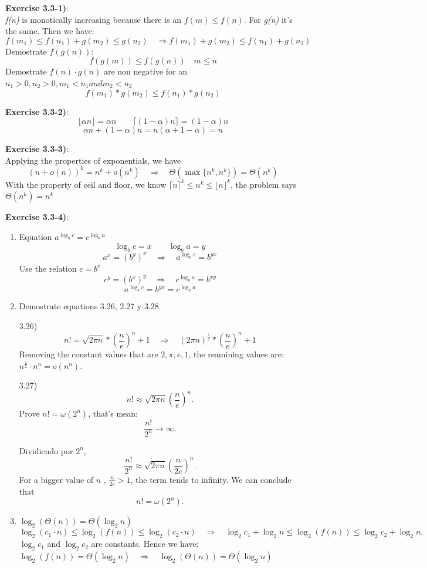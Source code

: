 \documentclass{article}
\newcounter{exercise}[section]   %
\begin{document}
\textbf{Exercise 3.3-1)}:\\
\textit{f(n)} is monotically increasing because there is an \(f(m) \leq f(n)\). For \textit{g(n)}
it's the same. Then we have: 
\[
f(m_1) \leq f(n_1) + g(m_2) \leq g(n_2) \quad \Rightarrow f(m_1) + g(m_2) \leq f(n_1) + g(n_2)
\]
Demostrate \(f(g(n))\):
\[
f(g(m)) \leq f(g(n)) \quad m \leq n
\]
Demostrate \(f(n) \cdot g(n)\) are non negative for an \(n_1 > 0, n_2 > 0, m_1 < n_1 and m_2 < n_2\) 
\[
f(m_1) * g(m_2) \leq f(n_1) * g(n_2)
\]

\textbf{Exercise 3.3-2)}:
\[
\lfloor \alpha n \rfloor = \alpha n \quad \quad \lceil (1 - \alpha)n \rceil = (1 - \alpha)n
\]
\[
\alpha n + (1 - \alpha)n = n(\alpha + 1 - \alpha) = n
\]

\textbf{Exercise 3.3-3)}:\\
Applying the properties of exponentials, we have
\[
(n + o(n))^k = n^k + o(n^k) \quad \Rightarrow \quad \Theta(\max \{n^k, n^k\}) = \Theta(n^k)
\]
With the property of ceil and floor, we know \(\lceil n \rceil^k \leq n^k \leq \lfloor n 
\rfloor^k\), the problem says \(\Theta(n^k) = n^k\)

\textbf{Exercise 3.3-4)}:
\begin{enumerate}[label=\alph*)]
    \item Equation \(a^{\log_b c} = c^{\log_b a}\)
    \[
    \log_b c = x \quad \quad \log_b a = y
    \]
    \[
    a^x = (b^y)^x \quad \Rightarrow \quad a^{\log_b c} = b^{yx}
    \]
    Use the relation \(c = b^x\)
    \[
    c^y = (b^x)^y \quad \Rightarrow \quad c^{\log_b a} = b^{xy}
    \]
    \[
    a^{\log_b c} = b^{yx} = c^{\log_b a}
    \]
    \newpage
    \item Demostrate equations 3.26, 2.27 y 3.28.

    3.26) 
    \[
    n! = \sqrt{2\pi n} * \left(\frac{n}{e}\right)^n + 1 \quad \Rightarrow \quad (2\pi n)^
    \frac{1}{2} * \left(\frac{n}{e}\right)^n + 1
    \]
    Removing the constant values that are \(2, \pi, e, 1\), the reamining values are:
    \(n^{\frac{1}{2}} \cdot n^n = o(n^n)\).

    3.27)
    \[
    n! \approx \sqrt{2 \pi n} \left(\frac{n}{e}\right)^n.
    \]
    Prove \( n! = \omega(2^n) \), that's mean:
    \[
    \frac{n!}{2^n} \to \infty.
    \]

    Dividiendo por \( 2^n \),
    \[
    \frac{n!}{2^n} \approx \sqrt{2\pi n} \left(\frac{n}{2e}\right)^n.
    \]
    For a bigger value of \( n \) , \( \frac{n}{2e} > 1 \), the term tends to infinity.
    We can conclude that
    \[
    n! = \omega(2^n).
    \]
    \item \(\log_2(\Theta(n)) = \Theta(\log_2 n)\)
    \[
    \log_2(c_1 \cdot n) \leq \log_2(f(n)) \leq \log_2(c_2 \cdot n) \quad \Rightarrow \quad
    \log_2 c_1 + \log_2 n \leq \log_2(f(n)) \leq \log_2 c_2 + \log_2 n.
    \]
    \(\log_2 c_1\) and \(\log_2 c_2\) are constants. Hence we have: \(\log_2(f(n)) = 
    \Theta(\log_2 n) \quad \Rightarrow \quad \log_2(\Theta(n)) = \Theta(\log_2 n)\)
\end{enumerate}
\end{document}
